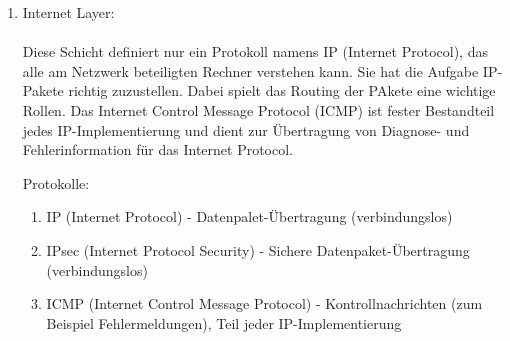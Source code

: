 \documentclass[11pt]{article}
\begin{document}
\begin{enumerate}
\begin{addmargin}[1em]{1em}
\begin{enumerate}
                \item SCTP (Stream Control Transmission Protocol) - Transportprotokoll.\\

                \item TLS (Transport Layer Security) - Erweiterung von TCP um Verschlüsselung.\\

                \item DTLS (Datagram Transport Layer Security) - Auf TLS basierendes
                Verschlüsselungsprotokoll, das auch über zustandslose Protokolle wie UDP
                übertragen werden kann.\\

            \end{enumerate}

        \end{addmargin}

        \item Internet Layer:\\\\
        Diese Schicht definiert nur ein Protokoll namens IP (Internet Protocol), das alle am Netzwerk
        beteiligten Rechner verstehen kann. Sie hat die Aufgabe IP-Pakete richtig zuzustellen. Dabei
        spielt das Routing der PAkete eine wichtige Rollen. Das Internet Control Message Protocol (ICMP)
        ist fester Bestandteil jedes IP-Implementierung und dient zur Übertragung von Diagnose- und
        Fehlerinformation für das Internet Protocol.\\

        \begin{addmargin}[1em]{1em}
            Protokolle:\\

            \begin{enumerate}

                \item IP (Internet Protocol) - Datenpalet-Übertragung (verbindungslos)\\

                \item IPsec (Internet Protocol Security) - Sichere Datenpaket-Übertragung (verbindungslos)\\

                \item ICMP (Internet Control Message Protocol) - Kontrollnachrichten (zum Beispiel Fehlermeldungen),
                Teil jeder IP-Implementierung\\


\end{enumerate}
\end{addmargin}
\end{enumerate}
\end{document}
